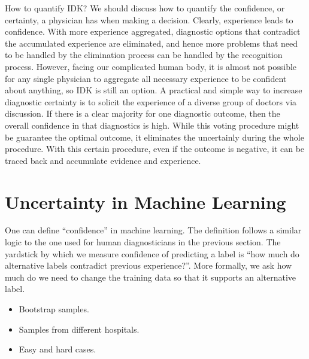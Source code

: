 \documentclass[9pt,twocolumn,twoside]{pnas-new}
\begin{document}

How to quantify IDK? We should discuss how to quantify the confidence, or certainty, a physician has when making a decision. Clearly, experience leads to confidence. With more experience aggregated, diagnostic options that contradict the accumulated
  experience are eliminated, and hence more problems that need to be handled by the elimination process can be handled by the recognition process. However, facing our complicated human body, it is almost not possible for any single physician to aggregate all necessary experience to be confident about anything, so IDK is still an option. A practical and simple way to increase diagnostic certainty is to solicit the experience of a diverse group of doctors via discussion. If there is a clear majority for one diagnostic outcome,
      then the overall confidence in that diagnostics is high. While this voting procedure might be guarantee the optimal outcome, it eliminates the uncertainly during the whole procedure. With this certain procedure, even if the outcome is negative, it can be traced back and accumulate evidence and experience. 
%


    
\section*{Uncertainty in Machine Learning}

One can define ``confidence'' in machine learning. The definition follows a
similar logic to the one used for human diagnosticians in the previous
section. The yardstick by which we measure confidence of predicting a
label is ``how much do alternative labels contradict previous
experience?''.
More formally, we ask how much do we need to change the training data
so that it supports an alternative label.




\begin{itemize}
  \item Bootstrap samples.
  \item Samples from different hospitals.
  \item Easy and hard cases.
  \end{itemize}
\end{document}
